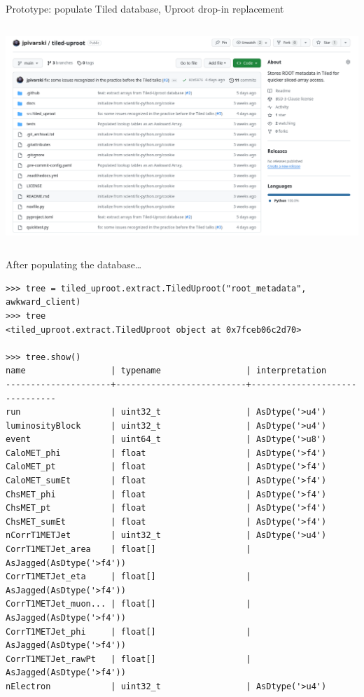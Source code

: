 \documentclass[aspectratio=169]{beamer}
\begin{document}
\begin{frame}{Prototype: populate Tiled database, Uproot drop-in replacement}
\vspace{0.2 cm}
\begin{columns}
\includegraphics[width=\linewidth]{tiled-uproot.png}
\end{columns}
\end{frame}

\begin{frame}[fragile]{After populating the database\ldots}
\vspace{0.32 cm}
\scriptsize
\begin{verbatim}
>>> tree = tiled_uproot.extract.TiledUproot("root_metadata", awkward_client)
>>> tree
<tiled_uproot.extract.TiledUproot object at 0x7fceb06c2d70>

>>> tree.show()
name                 | typename                 | interpretation                
---------------------+--------------------------+-------------------------------
run                  | uint32_t                 | AsDtype('>u4')
luminosityBlock      | uint32_t                 | AsDtype('>u4')
event                | uint64_t                 | AsDtype('>u8')
CaloMET_phi          | float                    | AsDtype('>f4')
CaloMET_pt           | float                    | AsDtype('>f4')
CaloMET_sumEt        | float                    | AsDtype('>f4')
ChsMET_phi           | float                    | AsDtype('>f4')
ChsMET_pt            | float                    | AsDtype('>f4')
ChsMET_sumEt         | float                    | AsDtype('>f4')
nCorrT1METJet        | uint32_t                 | AsDtype('>u4')
CorrT1METJet_area    | float[]                  | AsJagged(AsDtype('>f4'))
CorrT1METJet_eta     | float[]                  | AsJagged(AsDtype('>f4'))
CorrT1METJet_muon... | float[]                  | AsJagged(AsDtype('>f4'))
CorrT1METJet_phi     | float[]                  | AsJagged(AsDtype('>f4'))
CorrT1METJet_rawPt   | float[]                  | AsJagged(AsDtype('>f4'))
nElectron            | uint32_t                 | AsDtype('>u4')
\end{verbatim}
\end{frame}
\end{document}
